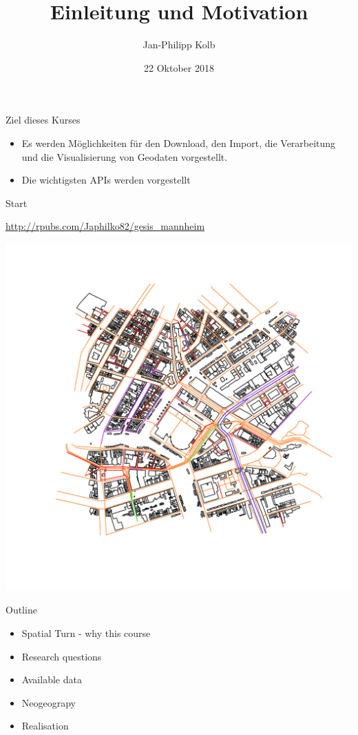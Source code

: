 \documentclass[ignorenonframetext,]{beamer}
\title{Einleitung und Motivation}
\author{Jan-Philipp Kolb}
\date{22 Oktober 2018}
\providecommand{\tightlist}{%
  \setlength{\itemsep}{0pt}\setlength{\parskip}{0pt}}
\begin{document}
\frame{\titlepage}

\begin{frame}{Ziel dieses Kurses}

\begin{itemize}
\tightlist
\item
  Es werden Möglichkeiten für den Download, den Import, die Verarbeitung
  und die Visualisierung von Geodaten vorgestellt.
\end{itemize}

\begin{itemize}
\tightlist
\item
  Die wichtigsten APIs werden vorgestellt
\end{itemize}

\end{frame}

\begin{frame}{Start}

\url{http://rpubs.com/Japhilko82/gesis_mannheim}

\includegraphics{figure/Amsterdam_osmplotr_highways.pdf}

\end{frame}

\begin{frame}{Outline}

\begin{itemize}
\tightlist
\item
  Spatial Turn - why this course
\item
  Research questions
\item
  Available data
\item
  Neogeograpy
\item
  Realisation
\end{itemize}

\end{frame}
\end{document}
